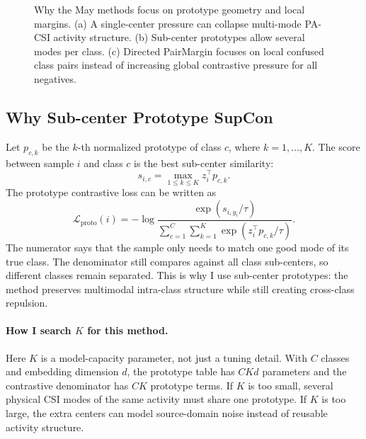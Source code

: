 \documentclass[11pt]{article}
\newcommand{\loss}{\mathcal{L}}
\begin{document}
\begin{figure}[H]
{%
}
\caption{Why the May methods focus on prototype geometry and local margins. (a) A single-center pressure can collapse multi-mode PA-CSI activity structure. (b) Sub-center prototypes allow several modes per class. (c) Directed PairMargin focuses on local confused class pairs instead of increasing global contrastive pressure for all negatives.}
\label{fig:geometry}
\end{figure}

\subsection{Why Sub-center Prototype SupCon}

Let $p_{c,k}$ be the $k$-th normalized prototype of class $c$, where $k=1,\dots,K$. The score between sample $i$ and class $c$ is the best sub-center similarity:
\[
s_{i,c} = \max_{1\le k\le K} z_i^\top p_{c,k}.
\]
The prototype contrastive loss can be written as
\[
\loss_{\mathrm{proto}}(i)
=
-\log
\frac{\exp(s_{i,y_i}/\tau)}
{\sum_{c=1}^{C}\sum_{k=1}^{K}\exp(z_i^\top p_{c,k}/\tau)}.
\]
The numerator says that the sample only needs to match one good mode of its true class. The denominator still compares against all class sub-centers, so different classes remain separated. This is why I use sub-center prototypes: the method preserves multimodal intra-class structure while still creating cross-class repulsion.

\paragraph{How I search $K$ for this method.}
Here $K$ is a model-capacity parameter, not just a tuning detail. With $C$ classes and embedding dimension $d$, the prototype table has $C K d$ parameters and the contrastive denominator has $C K$ prototype terms. If $K$ is too small, several physical CSI modes of the same activity must share one prototype. If $K$ is too large, the extra centers can model source-domain noise instead of reusable activity structure.
\end{document}
